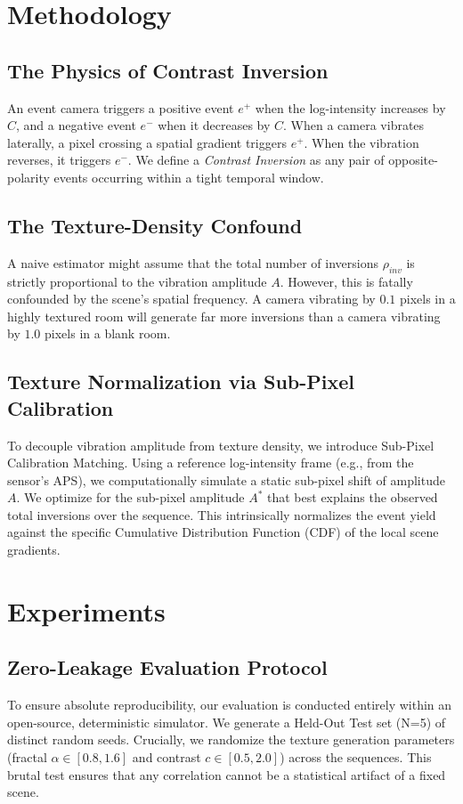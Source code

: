 \documentclass[conference]{IEEEtran}
\begin{document}
\section{Methodology}

\subsection{The Physics of Contrast Inversion}
An event camera triggers a positive event $e^+$ when the log-intensity increases by $C$, and a negative event $e^-$ when it decreases by $C$. When a camera vibrates laterally, a pixel crossing a spatial gradient triggers $e^+$. When the vibration reverses, it triggers $e^-$. We define a \textit{Contrast Inversion} as any pair of opposite-polarity events occurring within a tight temporal window.

\subsection{The Texture-Density Confound}
A naive estimator might assume that the total number of inversions $\rho_{inv}$ is strictly proportional to the vibration amplitude $A$. However, this is fatally confounded by the scene's spatial frequency. A camera vibrating by $0.1$ pixels in a highly textured room will generate far more inversions than a camera vibrating by $1.0$ pixels in a blank room.

\subsection{Texture Normalization via Sub-Pixel Calibration}
To decouple vibration amplitude from texture density, we introduce Sub-Pixel Calibration Matching. Using a reference log-intensity frame (e.g., from the sensor's APS), we computationally simulate a static sub-pixel shift of amplitude $A$. 
We optimize for the sub-pixel amplitude $A^*$ that best explains the observed total inversions over the sequence. This intrinsically normalizes the event yield against the specific Cumulative Distribution Function (CDF) of the local scene gradients.

\section{Experiments}
\subsection{Zero-Leakage Evaluation Protocol}
To ensure absolute reproducibility, our evaluation is conducted entirely within an open-source, deterministic simulator. We generate a Held-Out Test set (N=5) of distinct random seeds. Crucially, we randomize the texture generation parameters (fractal $\alpha \in [0.8, 1.6]$ and contrast $c \in [0.5, 2.0]$) across the sequences. This brutal test ensures that any correlation cannot be a statistical artifact of a fixed scene.
\end{document}
